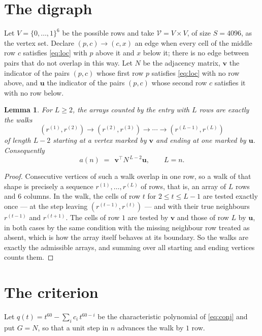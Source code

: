 \documentclass[11pt,a4paper]{article}
\theoremstyle{plain}
\newtheorem{lemma}[theorem]{Lemma}
\theoremstyle{definition}
\begin{document}
\section{The digraph}

Let $V=\{0,\dots,1\}^{6}$ be the possible rows and take
$\mathcal V=V\times V$, of size $S=4096$, as the vertex set. Declare $(p,c)\to(c,x)$ an edge
when every cell of the middle row $c$ satisfies \eqref{eq:loc} with $p$ above it and $x$
below it; there is no edge between pairs that do not overlap in this way. Let $N$ be the
adjacency matrix, $\mathbf{v}$ the indicator of the pairs $(p,c)$ whose first row $p$
satisfies \eqref{eq:loc} with no row above, and $\mathbf{u}$ the indicator of
the pairs $(p,c)$ whose second row $c$ satisfies it with no row below.

\begin{lemma}\label{lem:walk}
For $L\ge2$, the arrays counted by the entry with $L$ rows are exactly the walks
\[
(r^{(1)},r^{(2)})\to(r^{(2)},r^{(3)})\to\cdots\to(r^{(L-1)},r^{(L)})
\]
of length $L-2$ starting at a vertex marked by $\mathbf{v}$ and ending at one marked by
$\mathbf{u}$. Consequently
\[
a(n)\;=\;\,\mathbf{v}^{\!\top}N^{\,L-2}\mathbf{u},\qquad L=n .
\]
\end{lemma}

\begin{proof}
Consecutive vertices of such a walk overlap in one row, so a walk of that shape is
precisely a sequence $r^{(1)},\dots,r^{(L)}$ of rows, that is, an array of $L$ rows
and $6$ columns. In the walk, the cells of row $t$ for $2\le t\le L-1$ are tested
exactly once --- at the step leaving $(r^{(t-1)},r^{(t)})$ --- and with their true
neighbours $r^{(t-1)}$ and $r^{(t+1)}$. The cells of row $1$ are tested by
$\mathbf{v}$ and those of row $L$ by $\mathbf{u}$, in both cases by the same condition
with the missing neighbour row treated as absent, which is how the array itself behaves at
its boundary. So the walks are exactly the admissible arrays, and summing over all starting
and ending vertices counts them.
\end{proof}

\section{The criterion}

Let $q(t)=t^{60}-\sum_i c_i\,t^{60-i}$ be the characteristic polynomial of
\eqref{eq:conj} and put $G=N$, so that a unit step in $n$ advances the walk by
$1$ row.
\end{document}

